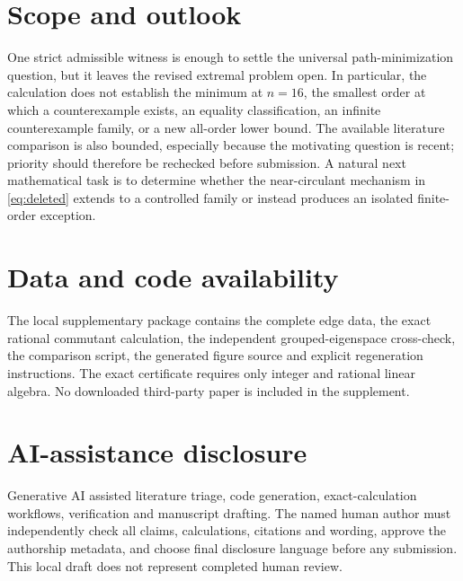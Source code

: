 \documentclass[11pt]{article}
\begin{document}
\section{Scope and outlook}

One strict admissible witness is enough to settle the universal
path-minimization question, but it leaves the revised extremal problem open.
In particular, the calculation does not establish the minimum at $n=16$, the
smallest order at which a counterexample exists, an equality classification,
an infinite counterexample family, or a new all-order lower bound.  The
available literature comparison is also bounded, especially because the
motivating question is recent; priority should therefore be rechecked before
submission.  A natural next mathematical task is to determine whether the
near-circulant mechanism in \eqref{eq:deleted} extends to a controlled family
or instead produces an isolated finite-order exception.

\section*{Data and code availability}

The local supplementary package contains the complete edge data, the exact
rational commutant calculation, the independent grouped-eigenspace
cross-check, the comparison script, the generated figure source and explicit
regeneration instructions.  The exact certificate requires only integer and
rational linear algebra.  No downloaded third-party paper is included in the
supplement.

\section*{AI-assistance disclosure}

Generative AI assisted literature triage, code generation, exact-calculation
workflows, verification and manuscript drafting.  The named human author must
independently check all claims, calculations, citations and wording, approve
the authorship metadata, and choose final disclosure language before any
submission.  This local draft does not represent completed human review.



\end{document}
